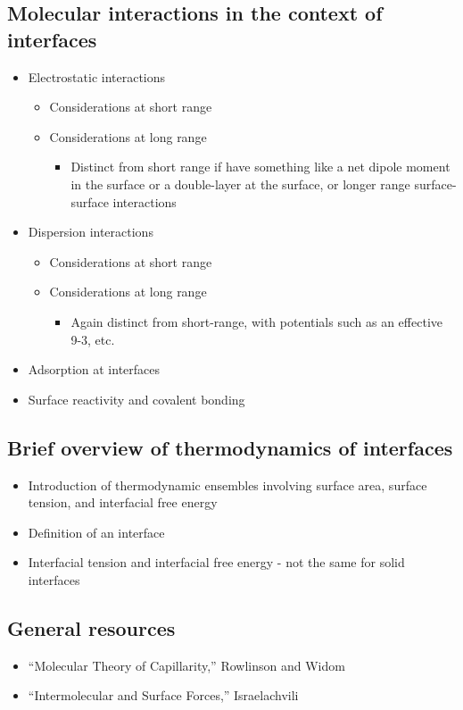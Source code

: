 \documentclass[9pt]{livecoms}
\begin{document}
\subsection{Molecular interactions in the context of interfaces}
\begin{itemize}
	\item Electrostatic interactions
	\begin{itemize}
		\item Considerations at short range
		\item Considerations at long range
		\begin{itemize}
			\item Distinct from short range if have something like a net dipole moment in the surface or a double-layer at the surface, or longer range surface-surface interactions
		\end{itemize}
	\end{itemize}
	\item Dispersion interactions
	\begin{itemize}
		\item Considerations at short range
		\item Considerations at long range 
		\begin{itemize}
			\item Again distinct from short-range, with potentials such as an effective 9-3, etc.
		\end{itemize}
	\end{itemize}
	\item Adsorption at interfaces
	\item Surface reactivity and covalent bonding
\end{itemize}

\subsection{Brief overview of thermodynamics of interfaces}
\begin{itemize}
	\item Introduction of thermodynamic ensembles involving surface area, surface tension, and interfacial free energy
	\item Definition of an interface 
	\item Interfacial tension and interfacial free energy - not the same for solid interfaces
\end{itemize}

\subsection{General resources}
\begin{itemize}
	\item “Molecular Theory of Capillarity,” Rowlinson and Widom \cite{RowlinsonWidom1982}
	\item “Intermolecular and Surface Forces,” Israelachvili \cite{Israelachvili2011}
\end{itemize}
\end{document}
